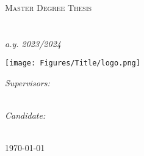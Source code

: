 
\begin{titlepage}
\begin{center}

{\scshape\LARGE \univname\par}\vspace{1.5cm} %
\textsc{\Large Master Degree Thesis}\\[0.5cm] %
\Large\deptname\\[0.5cm] %
\Large\facname\\[0.5cm] %
\textit{\normalsize a.y. 2023/2024} %

\texttt{[image: Figures/Title/logo.png]} %

{\huge \bfseries \ttitle\par}\vspace{0.4cm} %
 


\vfill

\begin{minipage}[t]{0.4\textwidth}
\begin{flushleft} \large
\emph{Supervisors:} \\[0.2cm]
\supname\\[0.3cm] %
\cosupname %
\end{flushleft}
\end{minipage}
\begin{minipage}[t]{0.4\textwidth}
\begin{flushright} \large
\emph{Candidate:}\\[0.2cm]
\authorname %
\end{flushright}
\end{minipage}\\[1cm]

{\large \monthyeardate\today}\\[4cm] %
 
\end{center}
\end{titlepage}
